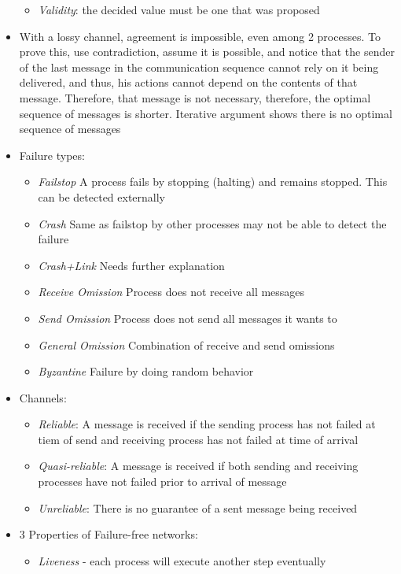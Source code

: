 \documentclass[a4paper,10pt,]{article}
\begin{document}
\begin{itemize}
\begin{itemize}
    \item \emph{Validity}: the decided value must be one that was proposed
  \end{itemize}
  \item With a lossy channel, agreement is impossible, even among 2 processes.  To prove this, use contradiction, assume it is possible, and notice that the sender of the last message in the communication sequence cannot rely on it being delivered, and thus, his actions cannot depend on the contents of that message.  Therefore, that message is not necessary, therefore, the optimal sequence of messages is shorter.  Iterative argument shows there is no optimal sequence of messages
  \item Failure types:
  \begin{itemize}
    \item \emph{Failstop} A process fails by stopping (halting) and remains stopped.  This can be detected externally
    \item \emph{Crash} Same as failstop by other processes may not be able to detect the failure
    \item \emph{Crash+Link} Needs further explanation
    \item \emph{Receive Omission} Process does not receive all messages
    \item \emph{Send Omission} Process does not send all messages it wants to
    \item \emph{General Omission} Combination of receive and send omissions
    \item \emph{Byzantine} Failure by doing random behavior
  \end{itemize}
  \item Channels:
  \begin{itemize}
    \item \emph{Reliable}: A message is received if the sending process has not failed at tiem of send and receiving process has not failed at time of arrival
    \item \emph{Quasi-reliable}: A message is received if both sending and receiving processes have not failed prior to arrival of message
    \item \emph{Unreliable}: There is no guarantee of a sent message being received
  \end{itemize}
  \item 3 Properties of Failure-free networks:
  \begin{itemize}
    \item \emph{Liveness} - each process will execute another step eventually

\end{itemize}
\end{itemize}
\end{document}
